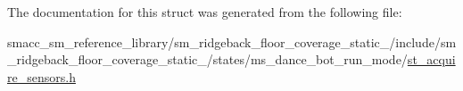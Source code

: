 The documentation for this struct was generated from the following file\+:\begin{DoxyCompactItemize}
\item 
smacc\+\_\+sm\+\_\+reference\+\_\+library/sm\+\_\+ridgeback\+\_\+floor\+\_\+coverage\+\_\+static\+\_/include/sm\+\_\+ridgeback\+\_\+floor\+\_\+coverage\+\_\+static\+\_/states/ms\+\_\+dance\+\_\+bot\+\_\+run\+\_\+mode/\hyperlink{sm__ridgeback__floor__coverage__static__1_2include_2sm__ridgeback__floor__coverage__static__1_2s8d631c3395ca0f2dfea7f5ba27795308}{st\+\_\+acquire\+\_\+sensors.\+h}\end{DoxyCompactItemize}
